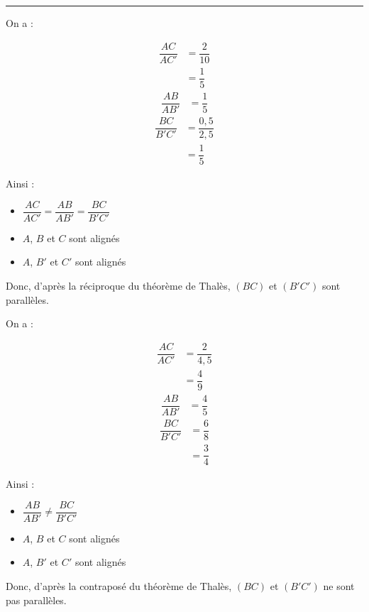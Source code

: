 \hrule \vspace{-0.5em}%
\begin{multicols}{2}
    \exo{}{} On a : \vspace{-0.5em}
    \begin{multicols}{3}
        \noindent
        \begin{align*}
            \dfrac{AC}{AC'}&=\dfrac{2}{10}\\
            &=\dfrac{1}{5}
        \end{align*}
        \begin{align*}
            \dfrac{AB}{AB'}&=\dfrac{1}{5}
        \end{align*}
        \begin{align*}
            \dfrac{BC}{B'C'}&=\dfrac{0,5}{2,5}\\
            &=\dfrac{1}{5}
        \end{align*}
    \end{multicols}
    \vspace{-1.75em }
    Ainsi :
    \begin{itemize}
        \item $\dfrac{AC}{AC'}=\dfrac{AB}{AB'}=\dfrac{BC}{B'C'}$\vspace{0.25em}
        \item $A$, $B$ et $C$ sont alignés
        \item $A$, $B'$ et $C'$ sont alignés
    \end{itemize}
    Donc, d'après la réciproque du théorème de Thalès, $(BC)$ et $(B'C')$ sont parallèles.
 
    \exo{}{} On a : \vspace{-0.5em}
    \begin{multicols}{3}
        \noindent
        \begin{align*}
            \dfrac{AC}{AC'}&=\dfrac{2}{4,5}\\
            &=\dfrac{4}{9}
        \end{align*}
        \begin{align*}
            \dfrac{AB}{AB'}&=\dfrac{4}{5}
        \end{align*}
        \begin{align*}
            \dfrac{BC}{B'C'}&=\dfrac{6}{8}\\
            &=\dfrac{3}{4}
        \end{align*}
    \end{multicols}
    \vspace{-1.75em }
    Ainsi :
    \begin{itemize}
        \item $\dfrac{AB}{AB'}\neq\dfrac{BC}{B'C'}$\vspace{0.25em}
        \item $A$, $B$ et $C$ sont alignés
        \item $A$, $B'$ et $C'$ sont alignés
    \end{itemize}
    Donc, d'après la contraposé du théorème de Thalès, $(BC)$ et $(B'C')$ ne sont pas parallèles.
\end{multicols}
